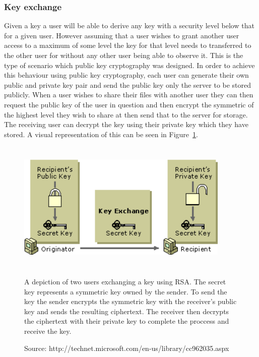 \documentclass[12pt, titlepage]{article}
\begin{document}
\subsubsection{Key exchange}
Given a key a user will be able to derive any key with a security level below that for a given user. However assuming that a user wishes to grant another user access to a maximum of some level the key for that level needs to transferred to the other user for without any other user being able to observe it. This is the type of scenario which public key cryptography was designed. In order to achieve this behaviour using public key cryptography, each user can generate their own public and private key pair and send the public key only the server to be stored publicly. When a user wishes to share their files with another user they can then request the public key of the user in question and then encrypt the symmetric of the highest level they wish to share at then send that to the server for storage. The receiving user can decrypt the key using their private key which they have stored.
\newline \indent A visual representation of this can be seen in Figure~\ref{fig:rsaKeyExchange}.

\begin{figure}
\centerline{\includegraphics[height=2.5in,width=4in,angle=0]{images/rsaKeyExchange.pdf}}
\caption[Caption for LOF]{A depiction of two users exchanging a key using RSA. The secret key represents a symmetric key owned by the sender. To send the key the sender encrypts the symmetric key with the receiver's public key and sends the resulting ciphertext. The receiver then decrypts the ciphertext with their private key to complete the proccess and receive the key.}
\label{fig:rsaKeyExchange}
 \caption*{Source: http://technet.microsoft.com/en-us/library/cc962035.aspx}
\end{figure}
\end{document}
